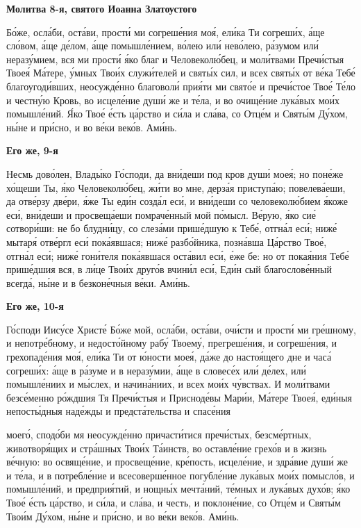  

\bfseries Молитва 8-я, святого Иоанна Златоустого\normalfont{}


   Бо́же, осла́би, оста́ви, прости́ ми согреше́ния моя́, ели́ка Ти согреши́х, а́ще
сло́вом, а́ще де́лом, а́ще помышле́нием, во́лею или́ нево́лею, ра́зумом или́
неразу́мием, вся ми прости́ я́ко благ и Человеколю́бец, и моли́твами
Пречи́стыя Твоея́ Ма́тере, у́мных Твои́х служи́телей и святы́х сил, и всех
святы́х от ве́ка Тебе́ благоугоди́вших, неосужде́нно благоволи́ прия́ти ми
свято́е и пречи́стое Твое́ Те́ло и честну́ю Кровь, во исцеле́ние души́ же и
те́ла, и во очище́ние лука́вых мои́х помышле́ний. Я́ко Твое́ е́сть ца́рство и
си́ла и сла́ва, со Отце́м и Святы́м Ду́хом, ны́не и при́сно, и во ве́ки веко́в.
Ами́нь.



 

\bfseries Его же, 9-я\normalfont{}


   Несмь дово́лен, Влады́ко Го́споди, да вни́деши под кров души́ моея́; но
поне́же хо́щеши Ты, я́ко Человеколю́бец, жи́ти во мне, дерза́я приступа́ю;
повелева́еши, да отве́рзу две́ри, я́же Ты еди́н созда́л еси́, и вни́деши со
человеколю́бием я́коже еси́, вни́деши и просвеща́еши помраче́нный мой
по́мысл. Ве́рую, я́ко сие́ сотвори́ши: не бо блудни́цу, со слеза́ми прише́дшую к
Тебе́, отгна́л еси́; ниже́ мытаря́ отве́ргл еси́ пока́явшася; ниже́ разбо́йника,
позна́вша Ца́рство Твое́, отгна́л еси́; ниже́ гони́теля пока́явшася оста́вил еси́,
е́же бе: но от покая́ния Тебе́ прише́дшия вся, в ли́це Твои́х друго́в вчини́л
еси́, Еди́н сый благослове́нный всегда́, ны́не и в безконе́чныя ве́ки.
Ами́нь.



 

\bfseries Его же, 10-я\normalfont{}


   Го́споди Иису́се Христе́ Бо́же мой, осла́би, оста́ви, очи́сти и прости́ ми
гре́шному, и непотре́бному, и недосто́йному рабу́ Твоему́, прегреше́ния, и
согреше́ния, и грехопаде́ния моя́, ели́ка Ти от ю́ности моея́, да́же до
настоя́щего дне и часа́ согреши́х: а́ще в ра́зуме и в неразу́мии, а́ще в словесе́х
или́ де́лех, или́ помышле́ниих и мы́слех, и начина́ниих, и всех мои́х чу́вствах.
И моли́твами безсе́менно ро́ждшия Тя Пречи́стыя и Присноде́вы Мари́и,
Ма́тере Твоея́, еди́ныя непосты́дныя наде́жды и предста́тельства и спасе́ния

моего́, сподо́би мя неосужде́нно причасти́тися пречи́стых, безсме́ртных,
животворя́щих и стра́шных Твои́х Та́инств, во оставле́ние грехо́в и в жизнь
ве́чную: во освяще́ние, и просвеще́ние, кре́пость, исцеле́ние, и здра́вие души́
же и те́ла, и в потребле́ние и всесоверше́нное погубле́ние лука́вых мои́х
помысло́в, и помышле́ний, и предприя́тий, и нощны́х мечта́ний, те́мных и
лука́вых духо́в; я́ко Твое́ е́сть ца́рство, и си́ла, и сла́ва, и честь, и
поклоне́ние, со Отце́м и Святы́м Твои́м Ду́хом, ны́не и при́сно, и во ве́ки
веко́в. Ами́нь.



